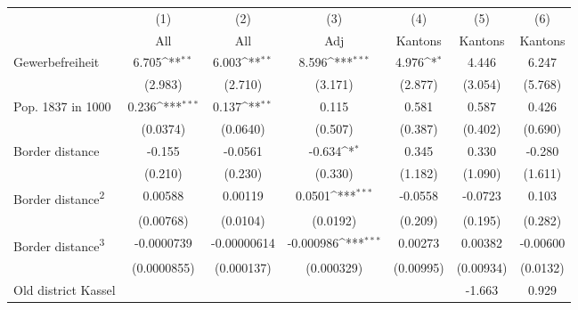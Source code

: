 {
\def\sym#1{\ifmmode^{#1}\else\(^{#1}\)\fi}
\begin{tabular}{l*{6}{c}}
\hline\hline
                    &\multicolumn{1}{c}{(1)}&\multicolumn{1}{c}{(2)}&\multicolumn{1}{c}{(3)}&\multicolumn{1}{c}{(4)}&\multicolumn{1}{c}{(5)}&\multicolumn{1}{c}{(6)}\\
                    &\multicolumn{1}{c}{All}&\multicolumn{1}{c}{All}&\multicolumn{1}{c}{Adj}&\multicolumn{1}{c}{Kantons}&\multicolumn{1}{c}{Kantons}&\multicolumn{1}{c}{Kantons}\\
\hline
Gewerbefreiheit     &       6.705\sym{**} &       6.003\sym{**} &       8.596\sym{***}&       4.976\sym{*}  &       4.446         &       6.247         \\
                    &     (2.983)         &     (2.710)         &     (3.171)         &     (2.877)         &     (3.054)         &     (5.768)         \\
[1em]
Pop. 1837 in 1000   &       0.236\sym{***}&       0.137\sym{**} &       0.115         &       0.581         &       0.587         &       0.426         \\
                    &    (0.0374)         &    (0.0640)         &     (0.507)         &     (0.387)         &     (0.402)         &     (0.690)         \\
[1em]
Border distance     &      -0.155         &     -0.0561         &      -0.634\sym{*}  &       0.345         &       0.330         &      -0.280         \\
                    &     (0.210)         &     (0.230)         &     (0.330)         &     (1.182)         &     (1.090)         &     (1.611)         \\
[1em]
Border distance\textsuperscript{2}&     0.00588         &     0.00119         &      0.0501\sym{***}&     -0.0558         &     -0.0723         &       0.103         \\
                    &   (0.00768)         &    (0.0104)         &    (0.0192)         &     (0.209)         &     (0.195)         &     (0.282)         \\
[1em]
Border distance\textsuperscript{3}&  -0.0000739         & -0.00000614         &   -0.000986\sym{***}&     0.00273         &     0.00382         &    -0.00600         \\
                    & (0.0000855)         &  (0.000137)         &  (0.000329)         &   (0.00995)         &   (0.00934)         &    (0.0132)         \\
[1em]
Old district Kassel &                     &                     &                     &                     &      -1.663         &       0.929         \\

\end{tabular}}
